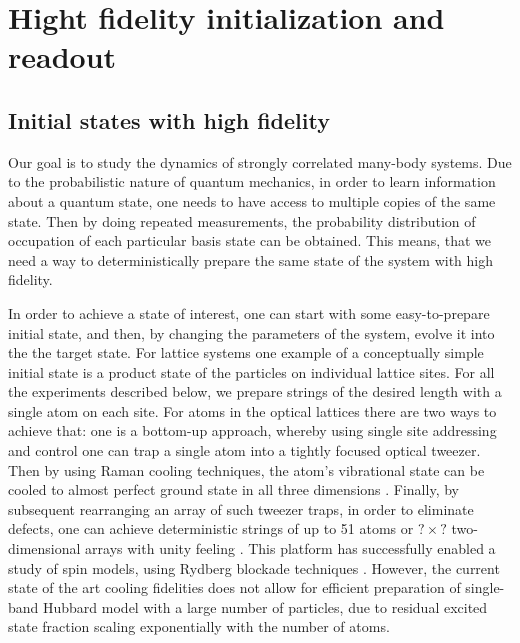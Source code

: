 \chapter{Hight fidelity initialization and readout}

\section{Initial states with high fidelity}

Our goal is to study the dynamics of strongly correlated many-body systems. Due to the probabilistic nature of quantum mechanics, in order to learn information about a quantum state, one needs to have access to multiple copies of the same state. Then by doing repeated measurements, the probability distribution of occupation of each particular basis state can be obtained. This means, that we need a way to deterministically prepare the same state of the system with high fidelity. 

In order to achieve a state of interest, one can start with some easy-to-prepare initial state, and then, by changing the parameters of the system, evolve it into the the target state. For lattice systems one example of a conceptually simple initial state is a product state of the particles on individual lattice sites. For all the experiments described below, we prepare strings of the desired length with a single atom on each site. For atoms in the optical lattices there are two ways to achieve that: one is a bottom-up approach, whereby using single site addressing and control one can trap a single atom into a tightly focused optical tweezer. Then by using Raman cooling techniques, the atom's vibrational state can be cooled to almost perfect ground state in all three dimensions \cite{adamo, selim}. Finally, by subsequent rearranging an array of such tweezer traps, in order to eliminate defects, one can achieve deterministic strings of up to 51 atoms \cite{misha} or $?\times?$ two-dimensional arrays with unity feeling \cite{broweys}. This platform has successfully enabled a study of spin models, using Rydberg blockade techniques \cite{misha}. However, the current state of the art cooling fidelities does not allow for efficient preparation of single-band Hubbard model with a large number of particles, due to residual excited state fraction scaling exponentially with the number of atoms.

